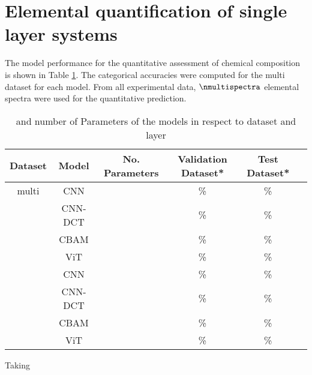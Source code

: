 \section{Elemental quantification of single layer systems}

The model performance for the quantitative assessment of chemical composition is shown in Table \ref{tab:acc_quant}. The categorical accuracies were computed for the multi dataset for each model.
From all experimental data, $\nmultispectra$ elemental spectra were used for the quantitative prediction. 

\begin{table}[H]
    \centering
    \begin{tabular}{c|c|c|c|c|c}
        \hline
       Dataset & Model   & No. Parameters & Validation Dataset*  & Test Dataset*    \\
        \hline
        multi  & CNN     &                &        \%              &         \% \\
               & CNN-DCT &                &       \%              &          \% \\
               & CBAM    &                &       \%              &          \% \\
               & ViT     &                &       \%              &          \% \\
               & CNN     &                &       \%              &          \%  \\
               & CNN-DCT &                &       \%              &          \%  \\
               & CBAM    &                &       \%              &          \% \\
               & ViT     &                &       \%              &          \% \\
    \end{tabular}
    \caption{ and number of Parameters of the models in respect to dataset and layer}
    \label{tab:acc_quant}
\end{table}


Taking 
